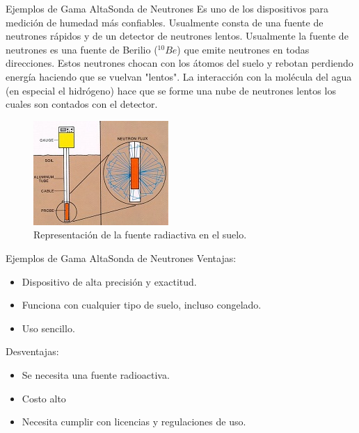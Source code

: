 \documentclass[]{beamer}
\begin{document}
\begin{frame}{Ejemplos de Gama Alta}{Sonda de Neutrones}
Es uno de los dispositivos para medición de humedad más confiables. Usualmente consta de una fuente de neutrones rápidos y de un detector de neutrones lentos. Usualmente la fuente de neutrones es una fuente de Berilio ($^{10}Be$) que emite neutrones en todas direcciones. Estos neutrones chocan con los átomos del suelo y rebotan perdiendo energía haciendo que se vuelvan "lentos". La interacción con la molécula del agua (en especial el hidrógeno) hace que se forme una nube de neutrones lentos los cuales son contados con el detector.

\begin{figure}
  \includegraphics[height=0.4\textheight]{Docs/sondaneutrones2}
  \caption{Representación de la fuente radiactiva en el suelo.}
  \label{}
\end{figure}

\end{frame}

\begin{frame}{Ejemplos de Gama Alta}{Sonda de Neutrones}
Ventajas:

\begin{itemize}
  \item Dispositivo de alta precisión y exactitud.
  \item Funciona con cualquier tipo de suelo, incluso congelado.
  \item Uso sencillo.
\end{itemize}

Desventajas:
\begin{itemize}
   \item Se necesita una fuente radioactiva.
   \item Costo alto
   \item Necesita cumplir con licencias y regulaciones de uso.
\end{itemize}

\end{frame}

\end{document}
